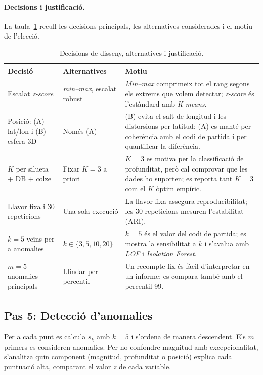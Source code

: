 \documentclass[11pt,a4paper]{article}
\begin{document}
\paragraph{Decisions i justificació.} La taula~\ref{tab:decisions} recull les
decisions principals, les alternatives considerades i el motiu de l'elecció.

\begin{table}[htbp]
\centering
\small
\begin{tabularx}{\textwidth}{@{}>{\raggedright\arraybackslash}p{3.0cm}>{\raggedright\arraybackslash}p{3.5cm}>{\raggedright\arraybackslash}X@{}}
\toprule
\textbf{Decisió} & \textbf{Alternatives} & \textbf{Motiu} \\
\midrule
Escalat \textit{z-score} & \textit{min--max}, escalat robust &
  \textit{Min--max} comprimeix tot el rang segons els extrems que volem
  detectar; \textit{z-score} és l'estàndard amb \textit{K-means}. \\
Posició: (A) lat/lon i (B) esfera 3D & Només (A) &
  (B) evita el salt de longitud i les distorsions per latitud; (A) es manté
  per coherència amb el codi de partida i per quantificar la diferència. \\
$K$ per silueta + DB + colze & Fixar $K=3$ a priori &
  $K=3$ es motiva per la classificació de profunditat, però cal comprovar que
  les dades ho suporten; es reporta tant $K=3$ com el $K$ òptim empíric. \\
Llavor fixa i 30 repeticions & Una sola execució &
  La llavor fixa assegura reproducibilitat; les 30 repeticions mesuren
  l'estabilitat (ARI). \\
$k=5$ veïns per a anomalies & $k\in\{3,5,10,20\}$ &
  $k=5$ és el valor del codi de partida; es mostra la sensibilitat a $k$ i
  s'avalua amb \textit{LOF} i \textit{Isolation Forest}. \\
$m=5$ anomalies principals & Llindar per percentil &
  Un recompte fix és fàcil d'interpretar en un informe; es compara també amb
  el percentil 99. \\
\bottomrule
\end{tabularx}
\caption{Decisions de disseny, alternatives i justificació.}\label{tab:decisions}
\end{table}

\subsection{Pas 5: Detecció d'anomalies}
Per a cada punt es calcula $s_k$ amb $k=5$ i s'ordena de manera descendent. Els
$m$ primers es consideren anomalies. Per no confondre magnitud amb
excepcionalitat, s'analitza quin component (magnitud, profunditat o posició)
explica cada puntuació alta, comparant el valor $z$ de cada variable.
\end{document}
